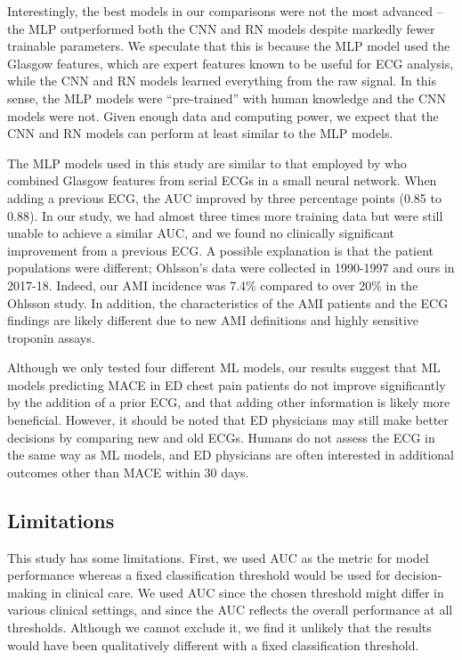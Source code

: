 \documentclass[preprint]{elsarticle}
\begin{document}
Interestingly, the best models in our comparisons were not the most advanced – the MLP outperformed both the CNN and RN models despite markedly fewer trainable parameters. We speculate that this is because the MLP model used the Glasgow features, which are expert features known to be useful for ECG analysis, while the CNN and RN models learned everything from the raw signal. In this sense, the MLP models were ``pre-trained'' with human knowledge and the CNN models were not. Given enough data and computing power, we expect that the CNN and RN models can perform at least similar to the MLP models.

The MLP models used in this study are similar to that employed by \citet{ohlsson2001} who combined Glasgow features from serial ECGs in a small neural network. When adding a previous ECG, the AUC improved by three percentage points (0.85 to 0.88). In our study, we had almost three times more training data but were still unable to achieve a similar AUC, and we found no clinically significant improvement from a previous ECG. A possible explanation is that the patient populations were different; Ohlsson's data were collected in 1990-1997 and ours in 2017-18. Indeed, our AMI incidence was 7.4\% compared to over 20\% in the Ohlsson study. In addition, the characteristics of the AMI patients and the ECG findings are likely different due to new AMI definitions and highly sensitive troponin assays. 

Although we only tested four different ML models, our results suggest that ML models predicting MACE in ED chest pain patients do not improve significantly by the addition of a prior ECG, and that adding other information is likely more beneficial. However, it should be noted that ED physicians may still make better decisions by comparing new and old ECGs. Humans do not assess the ECG in the same way as ML models, and ED physicians are often interested in additional outcomes other than MACE within 30 days.

\subsection{Limitations}
This study has some limitations. First, we used AUC as the metric for model performance whereas a fixed classification threshold would be used for decision-making in clinical care. We used AUC since the chosen threshold might differ in various clinical settings, and since the AUC reflects the overall performance at all thresholds. Although we cannot exclude it, we find it unlikely that the results would have been qualitatively different with a fixed classification threshold.
\end{document}
